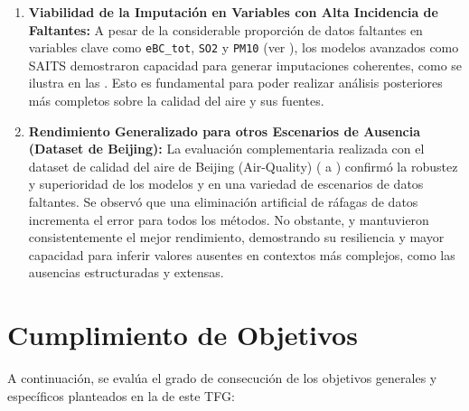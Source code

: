 \begin{enumerate}
    \item \textbf{Viabilidad de la Imputación en Variables con Alta Incidencia de Faltantes:}
    A pesar de la considerable proporción de datos faltantes en variables clave como \texttt{eBC\_tot}, \texttt{SO2} y \texttt{PM10} (ver ), los modelos avanzados como SAITS demostraron capacidad para generar imputaciones coherentes, como se ilustra en las . Esto es fundamental para poder realizar análisis posteriores más completos sobre la calidad del aire y sus fuentes.

    \item \textbf{Rendimiento Generalizado para otros Escenarios de Ausencia (Dataset de Beijing):}
    La evaluación complementaria realizada con el dataset de calidad del aire de Beijing (Air-Quality) ( a ) confirmó la robustez y superioridad de los modelos  y  en una variedad de escenarios de datos faltantes. Se observó que una eliminación artificial de ráfagas de datos incrementa el error para todos los métodos. No obstante,  y  mantuvieron consistentemente el mejor rendimiento, demostrando su resiliencia y mayor capacidad para inferir valores ausentes en contextos más complejos, como las ausencias estructuradas y extensas.
\end{enumerate}

\section{Cumplimiento de Objetivos}
\label{sec:cumplimiento_objetivos}

A continuación, se evalúa el grado de consecución de los objetivos generales y específicos planteados en la  de este TFG:

